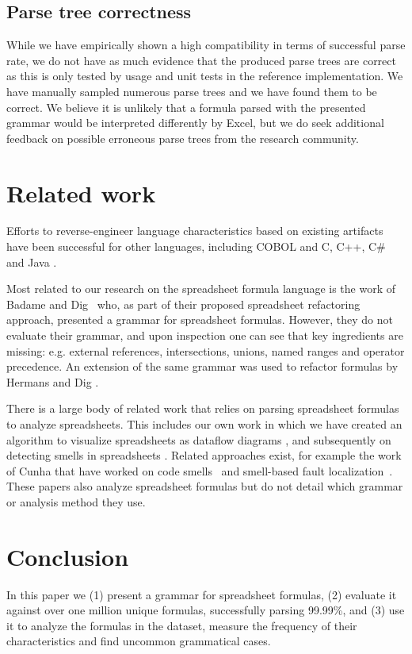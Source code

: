 \documentclass[conference]{IEEEtran}
\begin{document}
\subsection{Parse tree correctness}

While we have empirically shown a high compatibility in terms of successful parse rate, we do not have as much evidence that the produced parse trees are correct as this is only tested by usage and unit tests in the reference implementation. We have manually sampled numerous parse trees and we have found them to be correct. We believe it is unlikely that a formula parsed with the presented grammar would be interpreted differently by Excel, but we do seek additional feedback on possible erroneous parse trees from the research community.

\section{Related work}
\label{section:relatedWork}
Efforts to reverse-engineer language characteristics based on existing artifacts have been successful for other languages, including COBOL \cite{van1997obtaining} and C, C++, C\# and Java \cite{zaytsev2010recovery}.

Most related to our research on the spreadsheet formula language is the work of Badame and Dig~\cite{badame2012refactoring} who, as part of their proposed spreadsheet refactoring approach, presented a grammar for spreadsheet formulas. However, they do not evaluate their grammar, and upon inspection one can see that key ingredients are missing: e.g. external references, intersections, unions, named ranges and operator precedence. An extension of the same grammar was used to refactor formulas by Hermans and Dig \cite{hermans2014bumblebee}.

There is a large body of related work that relies on parsing spreadsheet formulas to analyze spreadsheets. This includes our own work in which we have created an algorithm to visualize spreadsheets as dataflow diagrams \cite{DBLP:conf/icse/HermansPD11}, and subsequently on detecting smells in spreadsheets \cite{DBLP:conf/icse/HermansPD12,DBLP:conf/icsm/Hermans212}. Related approaches exist, for example the work of Cunha that have worked on code smells~\cite{iccsa12} and smell-based fault localization~\cite{conf/icsme/CunhaFMPS14}. These papers also analyze spreadsheet formulas but do not detail which grammar or analysis method they use.

\section{Conclusion}
\label{section:conclusion}
In this paper we (1) present a grammar for spreadsheet formulas, (2) evaluate it against over one million unique formulas, successfully parsing 99.99\%, and (3) use it to analyze the formulas in the dataset, measure the frequency of their characteristics and find uncommon grammatical cases.
\end{document}
